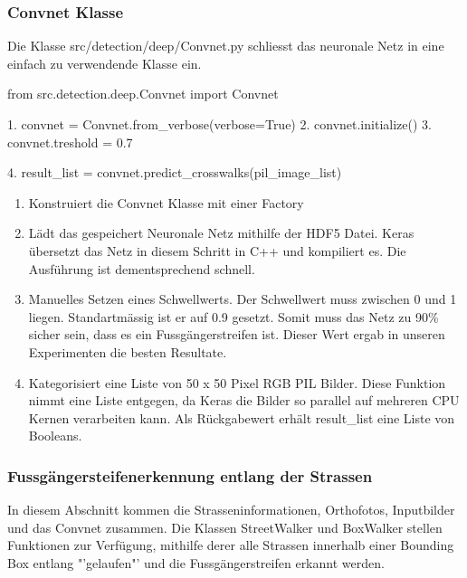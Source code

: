 \subsubsection{Convnet Klasse}
Die Klasse src/detection/deep/Convnet.py schliesst das neuronale Netz in eine einfach zu verwendende Klasse ein.
\\
\begin{python}
	   from src.detection.deep.Convnet import Convnet
	   
	1. convnet = Convnet.from_verbose(verbose=True)
	2. convnet.initialize()
	3. convnet.treshold = 0.7
	
	4. result_list = convnet.predict_crosswalks(pil_image_list)
\end{python}
\begin{enumerate}
	\item Konstruiert die Convnet Klasse mit einer Factory
	\item Lädt das gespeichert Neuronale Netz mithilfe der HDF5 Datei. Keras übersetzt das Netz in diesem Schritt in C++ und kompiliert es. Die Ausführung ist dementsprechend schnell.
	\item Manuelles Setzen eines Schwellwerts. Der Schwellwert muss zwischen 0 und 1 liegen. Standartmässig ist er auf 0.9 gesetzt. Somit muss das Netz zu 90\% sicher sein, dass es ein Fussgängerstreifen ist. Dieser Wert ergab in unseren Experimenten die besten Resultate.
	\item Kategorisiert eine Liste von 50 x 50 Pixel RGB PIL Bilder. Diese Funktion nimmt eine Liste entgegen, da Keras die Bilder so parallel auf mehreren CPU Kernen verarbeiten kann. Als Rückgabewert erhält result\_list eine Liste von Booleans.
\end{enumerate}

\subsubsection{Fussgängersteifenerkennung entlang der Strassen}
In diesem Abschnitt kommen die Strasseninformationen, Orthofotos, Inputbilder und das Convnet zusammen. Die Klassen StreetWalker und BoxWalker stellen Funktionen zur Verfügung, mithilfe derer alle Strassen innerhalb einer Bounding Box entlang "'gelaufen"' und die Fussgängerstreifen erkannt werden.

